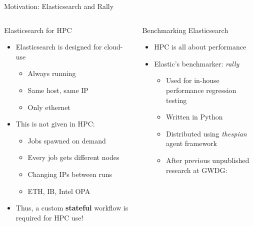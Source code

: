 \documentclass[compress,aspectratio=169]{beamer}
\begin{document}
  \begin{frame}{Motivation: Elasticsearch and Rally}
    \begin{columns}
      \begin{column}{0.5\textwidth}
        \begin{block}{Elasticsearch for HPC}
          \begin{itemize}
            \item Elasticsearch is designed for cloud-use
              \begin{itemize}
                \item Always running
                \item Same host, same IP
                \item Only ethernet
              \end{itemize}
            \item This is not given in HPC:
              \begin{itemize}
                \item Jobs spawned on demand
                \item Every job gets different nodes
                \item Changing IPs between runs
                \item ETH, IB, Intel OPA
              \end{itemize}
            \item Thus, a custom \textbf{stateful} workflow is required for HPC use!
          \end{itemize}
        \end{block}
      \end{column}
      \pause
      \begin{column}{0.5\textwidth}
        \begin{block}{Benchmarking Elasticsearch}
          \begin{itemize}
            \item HPC is all about performance
            \item Elastic's benchmarker: \emph{rally} \cite{es_benchmarking}
              \begin{itemize}
                \item Used for in-house performance regression testing
                \item Written in Python
                \item Distributed using \emph{thespian} agent framework
                \item After previous unpublished research at GWDG: 

\end{itemize}
\end{itemize}
\end{block}
\end{column}
\end{columns}
\end{frame}
\end{document}
